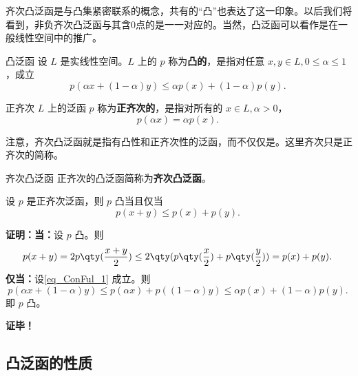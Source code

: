 
齐次凸泛函是与凸集紧密联系的概念，共有的“凸”也表达了这一印象。以后我们将看到，非负齐次凸泛函与其含0点的是一一对应的。当然，凸泛函可以看作是在一般线性空间中的推广。

\begin{definition}{凸泛函}
设 $L$ 是实线性空间。$L$ 上的 $p$ 称为\textbf{凸的}，是指对任意 $x,y\in L,0\leq\alpha\leq1$，成立
\begin{equation}
p(\alpha x+(1-\alpha)y)\leq \alpha p(x)+(1-\alpha)p(y).~
\end{equation}
\end{definition}

\begin{definition}{正齐次}
$L$ 上的泛函 $p$ 称为\textbf{正齐次的}，是指对所有的 $x\in L,\alpha >0$，
\begin{equation}
p(\alpha x)=\alpha p(x).~
\end{equation}
\end{definition}
注意，齐次凸泛函就是指有凸性和正齐次性的泛函，而不仅仅是。这里齐次只是正齐次的简称。
\begin{definition}{齐次凸泛函}
正齐次的凸泛函简称为\textbf{齐次凸泛函}。
\end{definition}

\begin{theorem}{}
设 $p$ 是正齐次泛函，则 $p$ 凸当且仅当 
\begin{equation}\label{eq_ConFul_1}
p(x+y)\leq p(x)+p(y).~
\end{equation}
\end{theorem}

\textbf{证明：}\textbf{当：}设 $p$ 凸。则
\begin{equation}
p(x+y)=2p\qty(\frac{x+y}{2})\leq 2\qty(p\qty(\frac{x}{2})+p\qty(\frac{y}{2}))=p(x)+p(y).~
\end{equation}
\textbf{仅当：}设\autoref{eq_ConFul_1} 成立。则
\begin{equation}
p(\alpha x+(1-\alpha)y)\leq p(\alpha x)+p((1-\alpha)y)\leq \alpha p(x)+(1-\alpha)p(y).~
\end{equation}
即 $p$ 凸。

\textbf{证毕！}

\subsection{凸泛函的性质}








